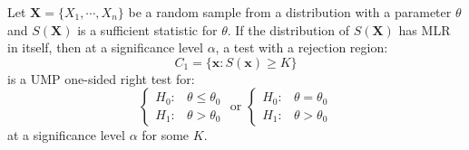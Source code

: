 \documentclass{huhtakm-template-book-v2}
\begin{document}
\begin{thm}
	Let $\mathbf{X}=\{X_{1},\cdots,X_{n}\}$ be a random sample from a distribution with a parameter $\theta$ and $S(\mathbf{X})$ is a sufficient statistic for $\theta$. If the distribution of $S(\mathbf{X})$ has MLR in itself, then at a significance level $\alpha$, a test with a rejection region:
	\begin{equation*}
		C_{1}=\{\mathbf{x}:S(\mathbf{x})\geq K\}
	\end{equation*}
	is a UMP one-sided right test for:
	\begin{equation*}
		\begin{cases}
			H_{0}: &\theta\leq\theta_{0}\\
			H_{1}: &\theta>\theta_{0}
		\end{cases}\text{ or }\begin{cases}
			H_{0}: &\theta=\theta_{0}\\
			H_{1}: &\theta>\theta_{0}
		\end{cases}
	\end{equation*}
	at a significance level $\alpha$ for some $K$.
\end{thm}
\end{document}
